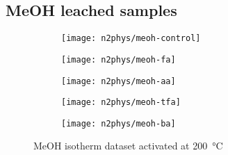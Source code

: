 \FloatBarrier%
\pagebreak
\subsection{MeOH leached samples}
\begin{figure}[!h]
    \centering
    \begin{subfigure}{0.4\linewidth}
        \texttt{[image: n2phys/meoh-control]}%
        \label{appx:def:fgr:n2phys-meoh-cont}
    \end{subfigure}
    \begin{subfigure}{0.4\linewidth}
        \texttt{[image: n2phys/meoh-fa]}%
        \label{appx:def:fgr:n2phys-meoh-fa}
    \end{subfigure}

    
    \begin{subfigure}{0.4\linewidth}
        \texttt{[image: n2phys/meoh-aa]}%
        \label{appx:def:fgr:n2phys-meoh-aa}
    \end{subfigure}
    \begin{subfigure}{0.4\linewidth}
        \texttt{[image: n2phys/meoh-tfa]}%
        \label{appx:def:fgr:n2phys-meoh-tfa}
    \end{subfigure}

    \begin{subfigure}{0.4\linewidth}
        \texttt{[image: n2phys/meoh-ba]}%
        \label{appx:def:fgr:n2phys-meoh-ba}
    \end{subfigure}

    \caption{MeOH isotherm dataset activated at \SI{200}{\degreeCelsius}}%
    
\end{figure}

\FloatBarrier%
\pagebreak
